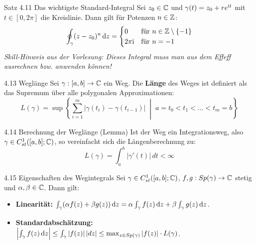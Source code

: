 \begin{rezept}{Satz 4.11 Das wichtigste Standard-Integral}
Sei $z_0 \in \mathbb{C}$ und $\gamma(t) = z_0 + r e^{\mathrm{i} t}$ mit $t \in [0, 2\pi]$ die Kreislinie. Dann gilt für Potenzen $n \in \mathbb{Z}$:
\[
    \oint_\gamma (z-z_0)^n \, \mathrm{d}z = \begin{cases} 
        0 & \text{für } n \in \mathbb{Z} \setminus \{-1\} \\ 
        2\pi \mathrm{i} & \text{für } n = -1 
    \end{cases}
\]
\textit{Skill-Hinweis aus der Vorlesung: Dieses Integral muss man aus dem Effeff ausrechnen bzw. anwenden können!}
\end{rezept}

\begin{defi}{4.13 Weglänge}
Sei $\gamma: [a,b] \to \mathbb{C}$ ein Weg. Die \textbf{Länge} des Weges ist definiert als das Supremum über alle polygonalen Approximationen:
\[
    L(\gamma) = \sup \left\{ \sum_{i=1}^m |\gamma(t_i) - \gamma(t_{i-1})| \;\middle|\; a = t_0 < t_1 < \dots < t_m = b \right\}
\]
\end{defi}

\begin{satz}{4.14 Berechnung der Weglänge (Lemma)}
Ist der Weg ein Integrationsweg, also $\gamma \in C_{st}^1([a,b]; \mathbb{C})$, so vereinfacht sich die Längenberechnung zu:
\[
    L(\gamma) = \int_a^b |\gamma'(t)| \, dt < \infty
\]
\end{satz}


\begin{satz}{4.15 Eigenschaften des Wegintegrals}
Sei $\gamma \in C_{st}^1([a,b]; \mathbb{C})$, $f, g: Sp(\gamma) \to \mathbb{C}$ stetig und $\alpha, \beta \in \mathbb{C}$. Dann gilt:
\begin{itemize}
    \item[i)] \textbf{Linearität:} $\int_\gamma (\alpha f(z) + \beta g(z)) \, \mathrm{d}z = \alpha \int_\gamma f(z) \, \mathrm{d}z + \beta \int_\gamma g(z) \, \mathrm{d}z$.
    \item[ii)] \textbf{Standardabschätzung:} $\left| \int_\gamma f(z) \, \mathrm{d}z \right| \le \int_\gamma |f(z)| \, |dz| \le \max_{z \in Sp(\gamma)} |f(z)| \cdot L(\gamma)$.
\end{itemize}
\end{satz}

